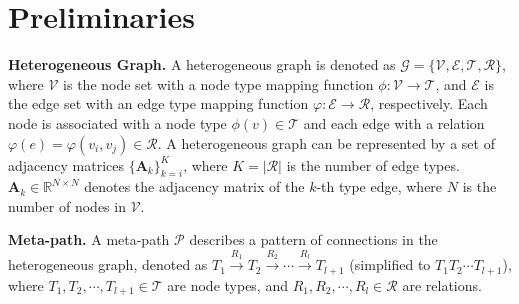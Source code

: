 \section{Preliminaries}

\begin{definition}{\textbf{Heterogeneous Graph.}}
    A heterogeneous graph is denoted as $\mathcal{G} = \{\mathcal{V},\mathcal{E}, \mathcal{T}, \mathcal{R}\}$, where $\mathcal{V}$ is the node set with a node type mapping function $\phi: \mathcal{V} \rightarrow \mathcal{T}$, and $\mathcal{E}$ is the edge set with an edge type mapping function $\varphi: \mathcal{E} \rightarrow \mathcal{R}$, respectively. Each node is associated with a node type $\phi(v) \in \mathcal{T}$ and each edge with a relation $\varphi(e) = \varphi(v_i,v_j) \in \mathcal{R}$. A heterogeneous graph can be represented by a set of adjacency matrices $\{\bm A_k\}_{k=i}^K$, where $K=|\mathcal{R}|$ is the number of edge types. $\bm A_k \in \mathbb{R}^{N \times N}$ denotes the adjacency matrix of the $k$-th type edge, where $N$ is the number of nodes in $\mathcal{V}$.
\end{definition}

\begin{definition}{\textbf{Meta-path.}}
    A meta-path $\mathcal{P}$ describes a pattern of connections in the heterogeneous graph, denoted as $T_1 \stackrel{R_1}{\longrightarrow} T_2 \stackrel{R_2}{\longrightarrow} \cdots \stackrel{R_l}{\longrightarrow} T_{l+1}$ (simplified to $T_1 T_2 \cdots T_{l+1}$), where $T_1,T_2,\cdots,T_{l+1} \in \mathcal{T}$ are node types, and $R_1,R_2,\cdots,R_l \in \mathcal{R}$ are relations.
\end{definition}


